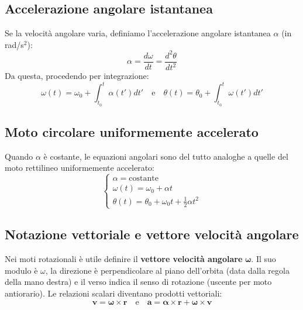\documentclass[12pt]{article}
\begin{document}
\subsection*{Accelerazione angolare istantanea}
Se la velocità angolare varia, definiamo l'accelerazione angolare istantanea $\alpha$ (in rad/s$^2$):
\begin{equation}
\alpha = \frac{d\omega}{dt} = \frac{d^2\theta}{dt^2}
\end{equation}
Da questa, procedendo per integrazione:
\begin{equation}
\omega(t) = \omega_0 + \int_{t_0}^t \alpha(t') dt' \quad \text{e} \quad \theta(t) = \theta_0 + \int_{t_0}^t \omega(t') dt'
\end{equation}

\subsection*{Moto circolare uniformemente accelerato}
Quando $\alpha$ è costante, le equazioni angolari sono del tutto analoghe a quelle del moto rettilineo uniformemente accelerato:
\begin{equation}
\begin{cases}
\alpha = \text{costante} \\
\omega(t) = \omega_0 + \alpha t \\
\theta(t) = \theta_0 + \omega_0 t + \frac{1}{2}\alpha t^2
\end{cases}
\end{equation}

\subsection*{Notazione vettoriale e vettore velocità angolare}
Nei moti rotazionali è utile definire il \textbf{vettore velocità angolare} $\boldsymbol{\omega}$. Il suo modulo è $\omega$, la direzione è perpendicolare al piano dell'orbita (data dalla regola della mano destra) e il verso indica il senso di rotazione (uscente per moto antiorario). Le relazioni scalari diventano prodotti vettoriali:
\begin{equation}
\mathbf{v} = \boldsymbol{\omega} \times \mathbf{r} \quad \text{e} \quad \mathbf{a} = \boldsymbol{\alpha} \times \mathbf{r} + \boldsymbol{\omega} \times \mathbf{v}
\end{equation}

\vspace{0.3cm}
\begin{center}
\end{center}
\vspace{0.3cm}
\end{document}
